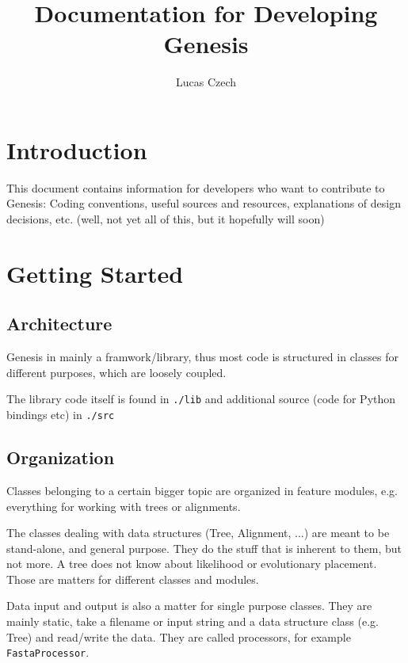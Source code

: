 \documentclass[a4paper,10pt]{article}
\title{Documentation for Developing Genesis}
\author{Lucas Czech}
\begin{document}
\maketitle

\section{Introduction}
\label{sec:Introduction}

This document contains information for developers who want to contribute to Genesis: Coding conventions, useful sources and resources, explanations of design decisions, etc. (well, not yet all of this, but it hopefully will soon)

\section{Getting Started}
\label{sec:GettingStarted}

\subsection{Architecture}
\label{sec:GettingStarted:sub:Architecture}

Genesis in mainly a framwork/library, thus most code is structured in classes for different purposes, which are loosely coupled.

The library code itself is found in \verb|./lib| and additional source (code for Python bindings etc) in \verb|./src|

\subsection{Organization}
\label{sec:GettingStarted:sub:Organization}

Classes belonging to a certain bigger topic are organized in feature modules, e.g. everything for working with trees or alignments.

The classes dealing with data structures (Tree, Alignment, ...) are meant to be stand-alone, and general purpose. They do the stuff that is inherent to them, but not more. A tree does not know about likelihood or evolutionary placement. Those are matters for different classes and modules.

Data input and output is also a matter for single purpose classes. They are mainly static, take a filename or input string and a data structure class (e.g. Tree) and read/write the data. They are called processors, for example \verb|FastaProcessor|.
\end{document}
